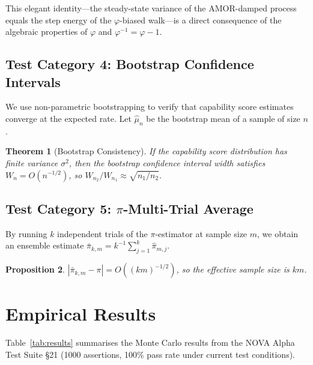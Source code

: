 \documentclass[11pt,a4paper]{article}
\newtheorem{theorem}{Theorem}
\newtheorem{proposition}[theorem]{Proposition}
\begin{document}
This elegant identity—the steady-state variance of the AMOR-damped process equals the
step energy of the $\varphi$-biased walk—is a direct consequence of the algebraic
properties of $\varphi$ and $\varphi^{-1} = \varphi - 1$.

\subsection{Test Category 4: Bootstrap Confidence Intervals}

We use non-parametric bootstrapping to verify that capability score estimates converge
at the expected rate.  Let $\hat{\mu}_n$ be the bootstrap mean of a sample of size $n$.

\begin{theorem}[Bootstrap Consistency]
If the capability score distribution has finite variance $\sigma^2$, then the
bootstrap confidence interval width satisfies $W_n = O(n^{-1/2})$, so
$W_{n_2} / W_{n_1} \approx \sqrt{n_1 / n_2}$.
\end{theorem}

\subsection{Test Category 5: $\pi$-Multi-Trial Average}

By running $k$ independent trials of the $\pi$-estimator at sample size $m$, we obtain
an ensemble estimate $\bar{\pi}_{k,m} = k^{-1} \sum_{j=1}^k \hat{\pi}_{m,j}$.

\begin{proposition}
$|\bar{\pi}_{k,m} - \pi| = O((km)^{-1/2})$, so the effective sample size is $km$.
\end{proposition}

\section{Empirical Results}
\label{sec:results}

Table~\ref{tab:results} summarises the Monte Carlo results from the NOVA Alpha Test
Suite §21 (1000 assertions, 100\% pass rate under current test conditions).
\end{document}
